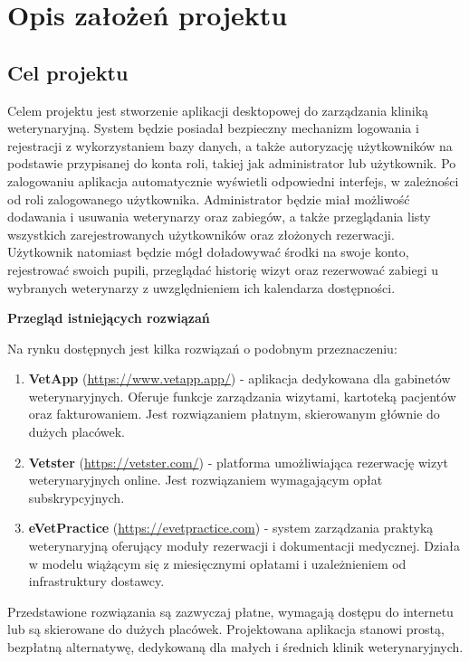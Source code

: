 \chapter{Opis założeń projektu}

\section{Cel projektu}

Celem projektu jest stworzenie aplikacji desktopowej do zarządzania 
kliniką weterynaryjną. System będzie posiadał bezpieczny mechanizm 
logowania i rejestracji z wykorzystaniem bazy danych, a także autoryzację 
użytkowników na podstawie przypisanej do konta roli, takiej jak administrator 
lub użytkownik. Po zalogowaniu aplikacja automatycznie wyświetli odpowiedni 
interfejs, w zależności od roli zalogowanego użytkownika. Administrator 
będzie miał możliwość dodawania i usuwania weterynarzy oraz zabiegów, a 
także przeglądania listy wszystkich zarejestrowanych użytkowników oraz 
złożonych rezerwacji. Użytkownik natomiast będzie mógł doładowywać środki 
na swoje konto, rejestrować swoich pupili, przeglądać historię wizyt oraz 
rezerwować zabiegi u wybranych weterynarzy z uwzględnieniem ich kalendarza 
dostępności.

\vspace{10pt}

\textbf{Przegląd istniejących rozwiązań}

Na rynku dostępnych jest kilka rozwiązań o podobnym przeznaczeniu:

\begin{enumerate}
\item \textbf{VetApp} (\url{https://www.vetapp.app/}) - aplikacja
dedykowana dla gabinetów weterynaryjnych. Oferuje funkcje zarządzania 
wizytami, kartoteką pacjentów oraz fakturowaniem. Jest rozwiązaniem 
płatnym, skierowanym głównie do dużych placówek.
\item \textbf{Vetster} (\url{https://vetster.com/}) - platforma umożliwiająca 
rezerwację wizyt weterynaryjnych online. Jest rozwiązaniem wymagającym opłat subskrypcyjnych.
\item\textbf{eVetPractice} (\url{https://evetpractice.com}) - system 
zarządzania praktyką weterynaryjną oferujący moduły rezerwacji 
i dokumentacji medycznej. Działa w modelu wiążącym się 
z miesięcznymi opłatami i uzależnieniem od infrastruktury dostawcy.
\end{enumerate}

\vspace{5pt}
Przedstawione rozwiązania są zazwyczaj płatne, wymagają dostępu do 
internetu lub są skierowane do dużych placówek. Projektowana aplikacja 
stanowi prostą, bezpłatną alternatywę, dedykowaną 
dla małych i średnich klinik weterynaryjnych.

